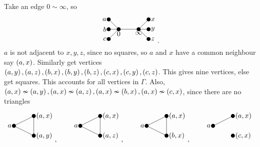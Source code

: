 \begin{example*}
\begin{itemize}
\pagebreak

Take an edge $ 0 \sim \infty $, so
$$
\begin{tikzpicture}
\fill (0, 0) circle (0.1) node[below]{$ 0 $};
\fill (1, 0) circle (0.1) node[below]{$ \infty $};
\fill (-0.5, 0.5) circle (0.1) node[left]{$ a $};
\fill (1.5, 0.5) circle (0.1) node[right]{$ x $};
\fill (-0.5, 0) circle (0.1) node[left]{$ b $};
\fill (1.5, 0) circle (0.1) node[right]{$ y $};
\fill (-0.5, -0.5) circle (0.1) node[left]{$ c $};
\fill (1.5, -0.5) circle (0.1) node[right]{$ z $};
\draw (0, 0) to (1, 0);
\draw (0, 0) to (-0.5, 0.5);
\draw (1, 0) to (1.5, 0.5);
\draw (0, 0) to (-0.5, 0);
\draw (1, 0) to (1.5, 0);
\draw (0, 0) to (-0.5, -0.5);
\draw (1, 0) to (1.5, -0.5);
\end{tikzpicture}.
$$
$ a $ is not adjacent to $ x, y, z $, since no squares, so $ a $ and $ x $ have a common neighbour say $ \br{a, x} $. Similarly get vertices $ \br{a, y}, \br{a, z}, \br{b, x}, \br{b, y}, \br{b, z}, \br{c, x}, \br{c, y}, \br{c, z} $. This gives nine vertices, else get squares. This accounts for all vertices in $ \Gamma $. Also, $ \br{a, x} \nsim \br{a, y}, \br{a, x} \nsim \br{a, z}, \br{a, x} \nsim \br{b, x}, \br{a, x} \nsim \br{c, x} $, since there are no triangles
$$
\begin{tikzpicture}
\fill (0, 0) circle (0.1) node[left]{$ a $};
\fill (1, 0.5) circle (0.1) node[right]{$ \br{a, x} $};
\fill (1, -0.5) circle (0.1) node[right]{$ \br{a, y} $};
\draw (0, 0) to (1, 0.5);
\draw (0, 0) to (1, -0.5);
\draw (1, 0.5) to (1, -0.5);
\end{tikzpicture},
\qquad
\begin{tikzpicture}
\fill (0, 0) circle (0.1) node[left]{$ a $};
\fill (1, 0.5) circle (0.1) node[right]{$ \br{a, x} $};
\fill (1, -0.5) circle (0.1) node[right]{$ \br{a, z} $};
\draw (0, 0) to (1, 0.5);
\draw (0, 0) to (1, -0.5);
\draw (1, 0.5) to (1, -0.5);
\end{tikzpicture},
\qquad
\begin{tikzpicture}
\fill (0, 0) circle (0.1) node[left]{$ a $};
\fill (1, 0.5) circle (0.1) node[right]{$ \br{a, x} $};
\fill (1, -0.5) circle (0.1) node[right]{$ \br{b, x} $};
\draw (0, 0) to (1, 0.5);
\draw (0, 0) to (1, -0.5);
\draw (1, 0.5) to (1, -0.5);
\end{tikzpicture},
\qquad
\begin{tikzpicture}
\fill (0, 0) circle (0.1) node[left]{$ a $};
\fill (1, 0.5) circle (0.1) node[right]{$ \br{a, x} $};
\fill (1, -0.5) circle (0.1) node[right]{$ \br{c, x} $};
\draw (0, 0) to (1, 0.5);

\end{tikzpicture}$$
\end{itemize}
\end{example*}
